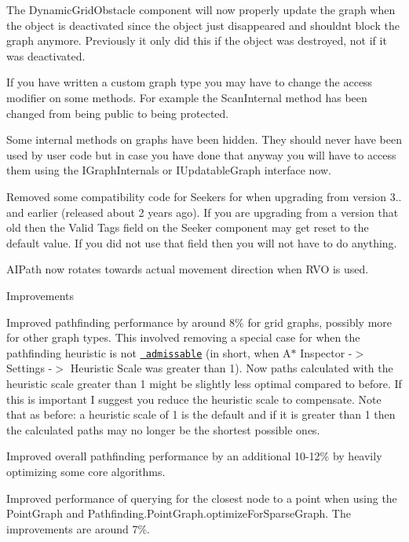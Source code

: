 \begin{DoxyItemize}
\begin{DoxyItemize}
\begin{DoxyItemize}
\item The Dynamic\+Grid\+Obstacle component will now properly update the graph when the object is deactivated since the object just disappeared and shouldn\textquotesingle{}t block the graph anymore. Previously it only did this if the object was destroyed, not if it was deactivated.
\item If you have written a custom graph type you may have to change the access modifier on some methods. For example the Scan\+Internal method has been changed from being public to being protected.
\item Some internal methods on graphs have been hidden. They should never have been used by user code but in case you have done that anyway you will have to access them using the I\+Graph\+Internals or I\+Updatable\+Graph interface now.
\item Removed some compatibility code for Seekers for when upgrading from version 3.. and earlier (released about 2 years ago). If you are upgrading from a version that old then the \textquotesingle{}Valid Tags\textquotesingle{} field on the Seeker component may get reset to the default value. If you did not use that field then you will not have to do anything.
\item A\+I\+Path now rotates towards actual movement direction when R\+VO is used.
\end{DoxyItemize}
\item Improvements
\begin{DoxyItemize}
\item Improved pathfinding performance by around 8\% for grid graphs, possibly more for other graph types. This involved removing a special case for when the pathfinding heuristic is not \href{https://en.wikipedia.org/wiki/Admissible_heuristic}{\texttt{ admissable}} (in short, when A$\ast$ Inspector -\/$>$ Settings -\/$>$ Heuristic Scale was greater than 1). Now paths calculated with the heuristic scale greater than 1 might be slightly less optimal compared to before. If this is important I suggest you reduce the heuristic scale to compensate. Note that as before\+: a heuristic scale of 1 is the default and if it is greater than 1 then the calculated paths may no longer be the shortest possible ones.
\item Improved overall pathfinding performance by an additional 10-\/12\% by heavily optimizing some core algorithms.
\item Improved performance of querying for the closest node to a point when using the Point\+Graph and Pathfinding.\+Point\+Graph.\+optimize\+For\+Sparse\+Graph. The improvements are around 7\%.

\end{DoxyItemize}
\end{DoxyItemize}
\end{DoxyItemize}
